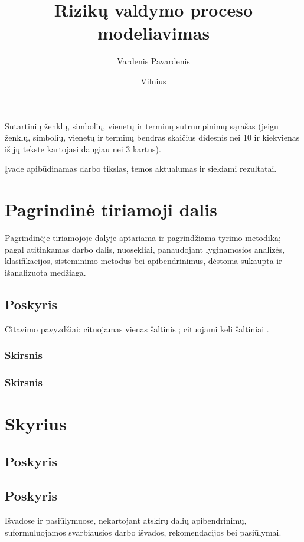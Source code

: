 \documentclass{VUMIFInfKursinis}
\institute{Informatikos institutas}  %
\title{Rizikų valdymo proceso modeliavimas}
\author{Vardenis Pavardenis}
\date{Vilnius \\ \the\year}
\begin{document}
\maketitle

\tableofcontents

Sutartinių ženklų, simbolių, vienetų ir terminų sutrumpinimų sąrašas (jeigu
ženklų, simbolių, vienetų ir terminų bendras skaičius didesnis nei 10 ir
kiekvienas iš jų tekste kartojasi daugiau nei 3 kartus).

Įvade apibūdinamas darbo tikslas, temos aktualumas ir siekiami rezultatai.

\section{Pagrindinė tiriamoji dalis}
Pagrindinėje tiriamojoje dalyje aptariama ir pagrindžiama tyrimo metodika;
pagal atitinkamas darbo dalis, nuosekliai, panaudojant lyginamosios analizės,
klasifikacijos, sisteminimo metodus bei apibendrinimus, dėstoma sukaupta ir
išanalizuota medžiaga.

\subsection{Poskyris}
Citavimo pavyzdžiai: cituojamas vienas šaltinis \cite{PvzStraipsnLt}; cituojami
keli šaltiniai \cite{PvzStraipsnEn, PvzKonfLt, PvzKonfEn, PvzKnygLt, PvzKnygEn,
PvzElPubLt, PvzElPubEn, PvzMagistrLt, PvzPhdEn}.

\subsubsection{Skirsnis}
\subsubsection{Skirsnis}
\section{Skyrius}
\subsection{Poskyris}
\subsection{Poskyris}

Išvadose ir pasiūlymuose, nekartojant atskirų dalių apibendrinimų,
suformuluojamos svarbiausios darbo išvados, rekomendacijos bei pasiūlymai.
\end{document}
